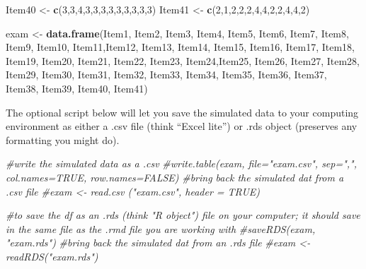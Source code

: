 \documentclass[
  english,
]{book}
\newenvironment{Shaded}{\begin{snugshade}}{\end{snugshade}}
\newcommand{\CommentTok}[1]{\textcolor[rgb]{0.56,0.35,0.01}{\textit{#1}}}
\newcommand{\DecValTok}[1]{\textcolor[rgb]{0.00,0.00,0.81}{#1}}
\newcommand{\KeywordTok}[1]{\textcolor[rgb]{0.13,0.29,0.53}{\textbf{#1}}}
\newcommand{\NormalTok}[1]{#1}
\newcommand{\StringTok}[1]{\textcolor[rgb]{0.31,0.60,0.02}{#1}}
\begin{document}
\begin{Shaded}
\begin{Highlighting}[]
\NormalTok{Item40 <-}\StringTok{ }\KeywordTok{c}\NormalTok{(}\DecValTok{3}\NormalTok{,}\DecValTok{3}\NormalTok{,}\DecValTok{4}\NormalTok{,}\DecValTok{3}\NormalTok{,}\DecValTok{3}\NormalTok{,}\DecValTok{3}\NormalTok{,}\DecValTok{3}\NormalTok{,}\DecValTok{3}\NormalTok{,}\DecValTok{3}\NormalTok{,}\DecValTok{3}\NormalTok{,}\DecValTok{3}\NormalTok{,}\DecValTok{3}\NormalTok{)}
\NormalTok{Item41 <-}\StringTok{ }\KeywordTok{c}\NormalTok{(}\DecValTok{2}\NormalTok{,}\DecValTok{1}\NormalTok{,}\DecValTok{2}\NormalTok{,}\DecValTok{2}\NormalTok{,}\DecValTok{2}\NormalTok{,}\DecValTok{4}\NormalTok{,}\DecValTok{4}\NormalTok{,}\DecValTok{2}\NormalTok{,}\DecValTok{2}\NormalTok{,}\DecValTok{4}\NormalTok{,}\DecValTok{4}\NormalTok{,}\DecValTok{2}\NormalTok{)}

\NormalTok{exam <-}\StringTok{ }\KeywordTok{data.frame}\NormalTok{(Item1, Item2, Item3, Item4, Item5, Item6, Item7, Item8, Item9, Item10, Item11,Item12, Item13, Item14, Item15, Item16, Item17, Item18, Item19, Item20, Item21, Item22, Item23, Item24,Item25, Item26, Item27, Item28, Item29, Item30, Item31, Item32, Item33, Item34, Item35, Item36, Item37, Item38, Item39, Item40, Item41)}
\end{Highlighting}
\end{Shaded}

The optional script below will let you save the simulated data to your computing environment as either a .csv file (think ``Excel lite'') or .rds object (preserves any formatting you might do).

\begin{Shaded}
\begin{Highlighting}[]
\CommentTok{#write the simulated data  as a .csv}
\CommentTok{#write.table(exam, file="exam.csv", sep=",", col.names=TRUE, row.names=FALSE)}
\CommentTok{#bring back the simulated dat from a .csv file}
\CommentTok{#exam <- read.csv ("exam.csv", header = TRUE)}
\end{Highlighting}
\end{Shaded}

\begin{Shaded}
\begin{Highlighting}[]
\CommentTok{#to save the df as an .rds (think "R object") file on your computer; it should save in the same file as the .rmd file you are working with}
\CommentTok{#saveRDS(exam, "exam.rds")}
\CommentTok{#bring back the simulated dat from an .rds file}
\CommentTok{#exam <- readRDS("exam.rds")}
\end{Highlighting}
\end{Shaded}
\end{document}
